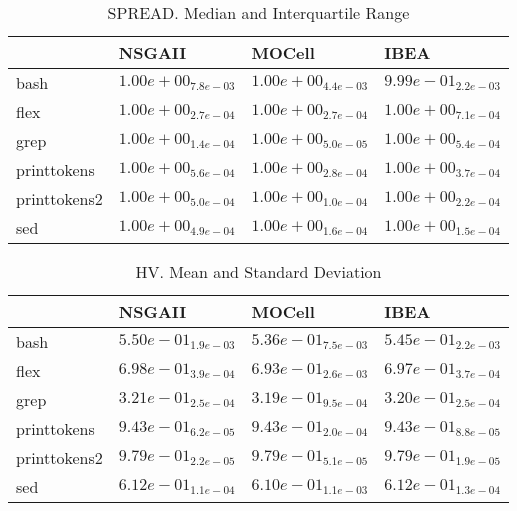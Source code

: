 \documentclass{article}
\begin{document}
\begin{table}
\caption{SPREAD. Median and Interquartile Range}
\label{table: SPREAD}
\centering
\begin{scriptsize}
\begin{tabular}{llll}
\hline & NSGAII & MOCell &  IBEA\\
\hline 
bash & \cellcolor{gray25}$  1.00e+00_{ 7.8e-03}$ & $  1.00e+00_{ 4.4e-03}$ & \cellcolor{gray95}$  9.99e-01_{ 2.2e-03}$ \\
flex & \cellcolor{gray25}$  1.00e+00_{ 2.7e-04}$ & $  1.00e+00_{ 2.7e-04}$ & \cellcolor{gray95}$  1.00e+00_{ 7.1e-04}$ \\
grep & \cellcolor{gray25}$  1.00e+00_{ 1.4e-04}$ & $  1.00e+00_{ 5.0e-05}$ & \cellcolor{gray95}$  1.00e+00_{ 5.4e-04}$ \\
printtokens & $  1.00e+00_{ 5.6e-04}$ & \cellcolor{gray95}$  1.00e+00_{ 2.8e-04}$ & \cellcolor{gray25}$  1.00e+00_{ 3.7e-04}$ \\
printtokens2 & $  1.00e+00_{ 5.0e-04}$ & \cellcolor{gray95}$  1.00e+00_{ 1.0e-04}$ & \cellcolor{gray25}$  1.00e+00_{ 2.2e-04}$ \\
sed & $  1.00e+00_{ 4.9e-04}$ & \cellcolor{gray25}$  1.00e+00_{ 1.6e-04}$ & \cellcolor{gray95}$  1.00e+00_{ 1.5e-04}$ \\
\hline
\end{tabular}
\end{scriptsize}
\end{table}

\begin{table}
\caption{HV. Mean and Standard Deviation}
\label{table: HV}
\centering
\begin{scriptsize}
\begin{tabular}{llll}
\hline & NSGAII & MOCell &  IBEA\\
\hline 
bash & \cellcolor{gray95}$  5.50e-01_{ 1.9e-03}$ & $  5.36e-01_{ 7.5e-03}$ & \cellcolor{gray25}$  5.45e-01_{ 2.2e-03}$ \\
flex & \cellcolor{gray95}$  6.98e-01_{ 3.9e-04}$ & $  6.93e-01_{ 2.6e-03}$ & \cellcolor{gray25}$  6.97e-01_{ 3.7e-04}$ \\
grep & \cellcolor{gray95}$  3.21e-01_{ 2.5e-04}$ & $  3.19e-01_{ 9.5e-04}$ & \cellcolor{gray25}$  3.20e-01_{ 2.5e-04}$ \\
printtokens & \cellcolor{gray95}$  9.43e-01_{ 6.2e-05}$ & $  9.43e-01_{ 2.0e-04}$ & \cellcolor{gray25}$  9.43e-01_{ 8.8e-05}$ \\
printtokens2 & \cellcolor{gray95}$  9.79e-01_{ 2.2e-05}$ & $  9.79e-01_{ 5.1e-05}$ & \cellcolor{gray25}$  9.79e-01_{ 1.9e-05}$ \\
sed & \cellcolor{gray95}$  6.12e-01_{ 1.1e-04}$ & $  6.10e-01_{ 1.1e-03}$ & \cellcolor{gray25}$  6.12e-01_{ 1.3e-04}$ \\
\hline
\end{tabular}
\end{scriptsize}
\end{table}
\end{document}
